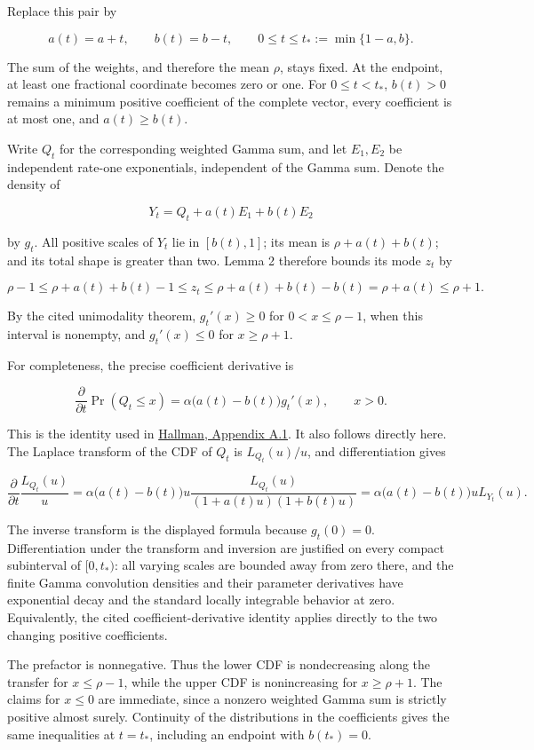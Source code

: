 \documentclass[10pt,a4paper]{article}
\begin{document}
Replace this pair by

\[
a(t)=a+t,\qquad b(t)=b-t,
\qquad 0\le t\le t_*:=\min\{1-a,b\}.
\]

The sum of the weights, and therefore the mean \(\rho\), stays fixed. At
the endpoint, at least one fractional coordinate becomes zero or one.
For \(0\le t<t_*\), \(b(t)>0\) remains a minimum positive coefficient of
the complete vector, every coefficient is at most one, and
\(a(t)\ge b(t)\).

Write \(Q_t\) for the corresponding weighted Gamma sum, and let
\(E_1,E_2\) be independent rate-one exponentials, independent of the
Gamma sum. Denote the density of

\[
Y_t=Q_t+a(t)E_1+b(t)E_2
\]

by \(g_t\). All positive scales of \(Y_t\) lie in \([b(t),1]\); its mean
is \(\rho+a(t)+b(t)\); and its total shape is greater than two. Lemma 2
therefore bounds its mode \(z_t\) by

\[
\rho-1
\le \rho+a(t)+b(t)-1
\le z_t
\le \rho+a(t)+b(t)-b(t)
=\rho+a(t)\le\rho+1.
\]

By the cited unimodality theorem, \(g_t'(x)\ge0\) for \(0<x\le\rho-1\),
when this interval is nonempty, and \(g_t'(x)\le0\) for \(x\ge\rho+1\).

For completeness, the precise coefficient derivative is

\[
\frac{\partial}{\partial t}\Pr(Q_t\le x)
=\alpha\bigl(a(t)-b(t)\bigr)g_t'(x),\qquad x>0.
\]

This is the identity used in
\href{https://arxiv.org/html/2411.15454v1\#A1}{Hallman, Appendix A.1}.
It also follows directly here. The Laplace transform of the CDF of
\(Q_t\) is \(L_{Q_t}(u)/u\), and differentiation gives

\[
\frac{\partial}{\partial t}\frac{L_{Q_t}(u)}u
=\alpha\bigl(a(t)-b(t)\bigr)u
\frac{L_{Q_t}(u)}{(1+a(t)u)(1+b(t)u)}
=\alpha\bigl(a(t)-b(t)\bigr)uL_{Y_t}(u).
\]

The inverse transform is the displayed formula because \(g_t(0)=0\).
Differentiation under the transform and inversion are justified on every
compact subinterval of \([0,t_*)\): all varying scales are bounded away
from zero there, and the finite Gamma convolution densities and their
parameter derivatives have exponential decay and the standard locally
integrable behavior at zero. Equivalently, the cited
coefficient-derivative identity applies directly to the two changing
positive coefficients.

The prefactor is nonnegative. Thus the lower CDF is nondecreasing along
the transfer for \(x\le\rho-1\), while the upper CDF is nonincreasing
for \(x\ge\rho+1\). The claims for \(x\le0\) are immediate, since a
nonzero weighted Gamma sum is strictly positive almost surely.
Continuity of the distributions in the coefficients gives the same
inequalities at \(t=t_*\), including an endpoint with \(b(t_*)=0\).
\end{document}
